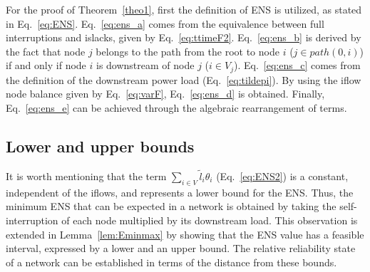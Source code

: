 \documentclass{article}
\begin{document}
For the proof of Theorem~\ref{theo1}, first the definition of ENS is utilized, as stated in Eq.~\eqref{eq:ENS}. Eq.~\eqref{eq:ens_a} comes from the equivalence between full interruptions and islacks, given by Eq.~\eqref{eq:ttimeF2}. Eq.~\eqref{eq:ens_b} is derived by the fact that node $j$ belongs to the path from the root to node $i$ ($j \in path(0,i)$) if and only if node $i$ is downstream of node $j$ ($i \in V_j$).  Eq.~\eqref{eq:ens_c} comes from the definition of the downstream power load (Eq.~\ref{eq:tildepi}). By using the iflow node balance given by Eq.~\eqref{eq:varF}, Eq.~\eqref{eq:ens_d} is obtained. Finally, Eq.~\eqref{eq:ens_e} can be achieved through the algebraic rearrangement of terms. 

\subsection{Lower and upper bounds} 

\label{ssec:lbub}

It is worth mentioning that the term $\displaystyle \sum_{i \in V}{\tilde{l}_i\theta_{i}}$ (Eq.~\ref{eq:ENS2}) is a constant, independent of the iflows, and represents a lower bound for the ENS.
Thus, the minimum ENS that can be expected in a network is obtained by taking the self-interruption of each node multiplied by its downstream load. This observation is extended in Lemma~\ref{lem:Eminmax} by showing that the ENS value has a feasible interval, expressed by a lower and an upper bound. The relative reliability state of a network can be established in terms of the distance from these bounds.
\end{document}

